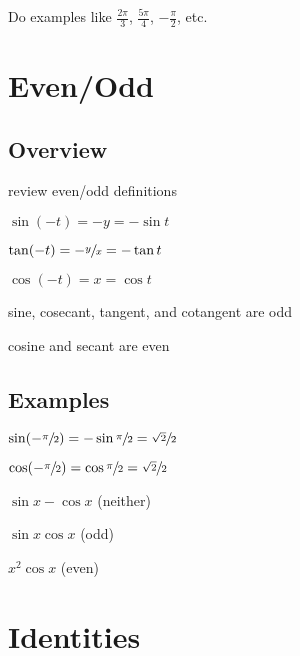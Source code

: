 \documentclass{exam}
\begin{document}
  Do examples like $\frac{2 \pi}{3}$, $\frac{5 \pi}{4}$, $- \frac{\pi}{2}$, etc.


  \section{Even/Odd}
  \subsection{Overview}
  \begin{itemize*}
    \item review even/odd definitions
    \item $\sin (-t) = -y = - \sin t$
    \item $\tan (-t) = - \sfrac{y}{x} = - \tan t$
    \item $\cos (-t) = x = \cos t$
    \item sine, cosecant, tangent, and cotangent are odd
    \item cosine and secant are even
  \end{itemize*}

  \subsection{Examples}
  \begin{itemize*}
    \item $\sin (- \sfrac{\pi}{2}) = - \sin \sfrac{\pi}{2} = \sfrac{\sqrt{2}}{2}$
    \item $\cos (- \sfrac{\pi}{2}) = \cos \sfrac{\pi}{2} = \sfrac{\sqrt{2}}{2}$

    \item $\sin x - \cos x$ (neither)
    \item $\sin x \cos x$ (odd)
    \item $x^2 \cos x$ (even)
  \end{itemize*}

  \section{Identities}
\end{document}
